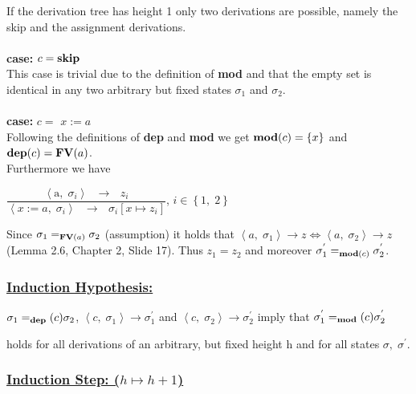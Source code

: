 \documentclass[12pt,a4paper]{article}
\newcommand{\eRelation}[2]{$\dfrac{\text{#1}}{\text{#2}}$}
\newcommand{\eState}[2]{$\left\langle \text{#1},\; \text{#2}\right\rangle$}
\newcommand{\eRule}[3]{\eState{#1}{#2} $\rightarrow$ #3}
\newcommand{\Mod}[0]{\text{\textbf{mod}}}
\newcommand{\dep}[0]{\text{\textbf{dep}}}
\newcommand{\FV}[0]{\text{\textbf{FV}}}
\begin{document}
	\indent\indent If the derivation tree has height 1 only two derivations are possible, namely \indent the skip and the assignment derivations.\\\\
	\indent \textbf{case:} $c=\text{\textbf{skip}}$\\
	\indent\indent This case is trivial due to the definition of \textbf{mod} and that the empty set is \indent\indent identical in any two arbitrary but fixed states $\sigma_{1}$ and $\sigma_{2}$.\\\\
	\indent \textbf{case:} $c=$ {\boldmath$x:=a$}\\
	\indent\indent Following the definitions of \textbf{dep} and \textbf{mod} we get $\Mod(c)=\left\lbrace x\right\rbrace$ and \indent\indent $\dep(c)=\FV(a)$.\\
	\indent\indent Furthermore we have
	\begin{center}
		\eRelation
			{\eRule{a}{$\sigma_{i}$}{$z_{i}$}}
			{\eRule{$x:=a$}{$\sigma_{i}$}{$\sigma_{i}\left[ x\mapsto z_{i}\right]$}}, $i\in \left\lbrace 1,\; 2\right\rbrace$\\
	\end{center}
	\indent\indent\indent Since $\sigma_{1}=_{\FV(a)}\sigma_{2}$ (assumption) it holds that $\left\langle a,\; \sigma_{1}\right\rangle\rightarrow z \Leftrightarrow \left\langle a,\; \sigma_{2}\right\rangle\rightarrow z$ \indent\indent(Lemma 2.6, Chapter 2, Slide 17). Thus $z_{1}=z_{2}$ and moreover $\sigma^{'}_{1}=_{\Mod(c)}\sigma^{'}_{2}$.
	
	\subsubsection*{\underline{Induction Hypothesis:}}
	
	\begin{center}
		$\sigma_{1} =_\dep(c) \sigma_{2}$, $\left\langle c,\; \sigma_{1} \right\rangle \rightarrow \sigma^{'}_{1}$ and $\left\langle c, \; \sigma_{2}\right\rangle \rightarrow \sigma^{'}_{2}$ imply that $\sigma^{'}_{1} =_\Mod(c)\sigma^{'}_{2}$
	\end{center}
	\indent\indent holds for all derivations of an arbitrary, but fixed height h and for all states \indent$\sigma,\; \sigma^{'}$.
	
	\subsubsection*{\underline{Induction Step: ({\boldmath$h\mapsto h+1$})}}
	
\end{document}
